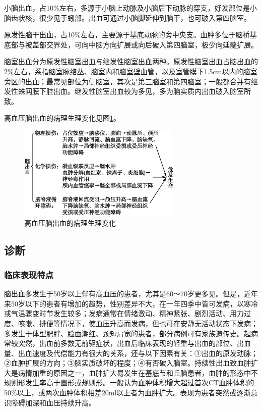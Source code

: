 小脑出血，占10\%左右，多源于小脑上动脉及小脑后下动脉的穿支，好发部位是小脑齿状核，很少见于蚓部。出血可通过小脑脚延伸到脑干，也可破入第四脑室。

原发性脑干出血，占10\%左右，主要源于基底动脉的旁中央支。血肿多位于脑桥基底部与被盖部交界处，可向中脑方向扩展或向后破入第四脑室，极少向延髓扩展。

脑室出血分为原发性脑室出血与继发性脑室出血两种。原发性脑室出血占脑出血的2\%左右，系指脑室脉络丛、脑室内和脑室壁血管，以及室管膜下1.5cm以内的脑室旁区的出血；最常见部位为侧脑室，其次是第三脑室和第四脑室；一般都合并有继发性蛛网膜下腔出血。继发性脑室出血较为多见，多为脑实质内出血破入脑室所致。

高血压脑出血的病理生理变化见图\ref{fig84-1}。

\begin{figure}[!htbp]
 \centering
 \includegraphics[width=3.09375in,height=1.76042in]{./images/Image00376.jpg}
 \captionsetup{justification=centering}
 \caption{高血压脑出血的病理生理变化}
 \label{fig84-1}
  \end{figure} 

\subsection{诊断}

\subsubsection{临床表现特点}

脑出血多发生于50岁以上伴有高血压的患者，尤其是60～70岁更多见。但是，近年来50岁以下的患者有增加的趋势，性别差异不大，在一年四季中皆可发病，以寒冷或气温骤变时节发生较多；发病通常在情绪激动、精神紧张、剧烈活动、用力过度、咳嗽、排便等情况下，使血压升高而发病，但也可在安静无活动状态下发病；多发生于体型肥胖、脸面潮红、颈短肩宽的患者，部分病例可有家族遗传史。起病常较突然，出血前多数无前驱症状，出血后临床表现的轻重与出血的部位、出血量、出血速度及代偿能力有很大的关系，还与以下因素有关：①出血的原发动脉；②血肿扩展的方向；③脑实质破坏的程度；④有否破入脑室。持续性出血致血肿扩大是病情加重的原因之一，血肿扩大易发生在基底节和丘脑患者，血肿的形态中不规则形发生率高于圆形或规则形。一般认为血肿体积增大超过首次CT血肿体积的50\%以上，或两次血肿体积相差20ml以上者为血肿扩大。表现为患者突然或逐渐意识障碍加深和血压持续升高。

